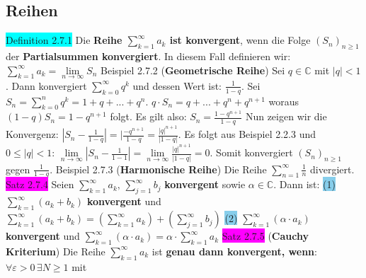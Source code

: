 \documentclass[landscape, 10pt]{article}
\newcommand{\C}{\mathbb{C}}
\begin{document}
\begin{multicols}{3}
\subsection{Reihen}
\colorbox{cyan}{Definition 2.7.1} Die \textbf{Reihe $\sum_{k=1}^\infty a_k$ ist konvergent}, 
                wenn die Folge \textcolor{NavyBlue}{$(S_n)_{n\geqslant1}$} 
                der \textbf{Partialsummen konvergiert}. In 
         diesem Fall definieren wir: 
                \textcolor{NavyBlue}{
                $\sum_{k=1}^\infty a_k=\lim\limits_{n\to\infty}S_n$}
\colorbox{Dandelion}{Beispiel 2.7.2} (\textbf{Geometrische Reihe}) Sei $q\in\C$ mit 
                $|q|<1$. Dann konvergiert $\sum_{k=0}^\infty q^k$ und
                dessen Wert ist: $\frac{1}{1-q}$. 
         Sei $S_n=\sum_{k=0}^n q^k=1+q+...+q^n.$
                $q\cdot S_n=q+...+q^n+q^{n+1}$ woraus
                $(1-q)S_n=1-q^{n+1}$ folgt. Es gilt 
         also: $S_n=\frac{1-q^{n+1}}{1-q}$
                Nun zeigen wir die Konvergenz: 
                $|S_n-\frac{1}{1-q}|=|\frac{-q^{n+1}}{1-q}
                =\frac{|q|^{n+1}}{|1-q|}$. Es folgt aus
                Beispiel 2.2.3 
         und $0\leqslant|q|<1$:
                $\lim\limits_{n\to\infty}|S_n-\frac{1}{1-1}|
                =\lim\limits_{n\to\infty}\frac{|q|^{n+1}}{|1-q|}=0$.
                Somit konvergiert $(S_n)_{n\geqslant1}$ gegen
                $\frac{1}{1-q}$. 
\colorbox{Dandelion}{Beispiel 2.7.3} (\textbf{Harmonische Reihe}) Die Reihe
                $\sum_{n=1}^\infty\frac{1}{n}$ divergiert.
\colorbox{magenta}{Satz 2.7.4} Seien 
                \textcolor{NavyBlue}{$\sum_{k=1}^\infty a_k,\,\sum_{j=1}^\infty b_j$} 
                \textbf{konvergent} sowie \textcolor{NavyBlue}{$\alpha\in\C$}. 
                Dann ist:
                \colorbox{SkyBlue}{(1)} 
                \textcolor{NavyBlue}{$\sum_{k=1}^\infty(a_k+b_k)$} 
                \textbf{konvergent} und 
         \textcolor{NavyBlue}{
                $\sum_{k=1}^\infty(a_k+b_k)=(\sum_{k=1}^\infty a_k)+(\sum_{j=1}^\infty b_j)$}
                \colorbox{SkyBlue}{(2)} 
                \textcolor{NavyBlue}{$\sum_{k=1}^\infty(\alpha\cdot a_k)$} 
                \textbf{konvergent} und 
                \textcolor{NavyBlue}{
                $\sum_{k=1}^\infty(\alpha\cdot a_k)=\alpha\cdot\sum_{k=1}^\infty a_k$}
\colorbox{magenta}{Satz 2.7.5} (\textbf{Cauchy Kriterium}) Die Reihe 
                \textcolor{NavyBlue}{$\sum_{k=1}^\infty a_k$ }
                ist \textbf{genau dann konvergent, wenn}:
         \textcolor{NavyBlue}{$\forall\varepsilon >0\,\exists N\geqslant1$} mit 

\end{multicols}
\end{document}
